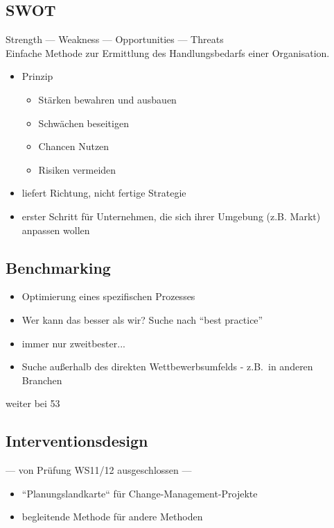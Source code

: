 \documentclass[a4paper, 12pt]{article}
\begin{document}
\subsection{SWOT}
Strength --- Weakness --- Opportunities --- Threats\\
Einfache Methode zur Ermittlung des Handlungsbedarfs einer Organisation.
\begin{itemize}
  \item Prinzip
    \begin{itemize}
      \item Stärken bewahren und ausbauen
      \item Schwächen beseitigen
      \item Chancen Nutzen
      \item Risiken vermeiden
    \end{itemize}
  \item liefert Richtung, nicht fertige Strategie
  \item erster Schritt für Unternehmen, die sich ihrer Umgebung (z.B. Markt) anpassen wollen
\end{itemize}


\subsection{Benchmarking}
\begin{itemize}
  \item Optimierung eines spezifischen Prozesses
  \item Wer kann das besser als wir? Suche nach ``best practice''
  \item immer nur zweitbester...
  \item Suche außerhalb des direkten Wettbewerbsumfelds - z.B.\ in anderen Branchen
\end{itemize}
weiter bei 53


\subsection{Interventionsdesign}
--- von Prüfung WS11/12 ausgeschlossen ---
\begin{itemize}
  \item ``Planungslandkarte`` für Change-Management-Projekte
  \item begleitende Methode für andere Methoden
\end{itemize}
\end{document}
